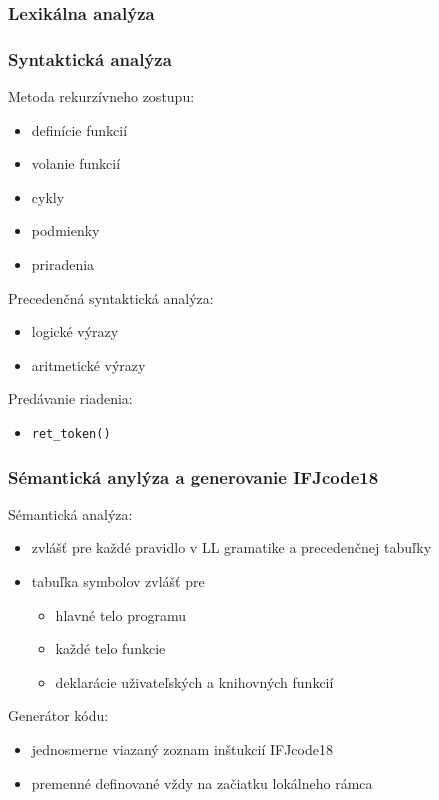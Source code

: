 \documentclass[usenames,dvipsnames]{beamer}
\begin{document}
\begin{frame}
	\frametitle{Lexikálna analýza}

\end{frame}
%	
\begin{frame}
	\frametitle{Syntaktická analýza}
	Metoda rekurzívneho zostupu:
	\begin{itemize}
		\item definície funkcií
	 	\item volanie funkcií
		\item cykly
		\item podmienky
		\item priradenia
	\end{itemize}
	Precedenčná syntaktická analýza:
	\begin{itemize}
		\item logické výrazy
		\item aritmetické výrazy
	\end{itemize}
	Predávanie riadenia:
	\begin{itemize}
		\item \texttt{ret\_token()}
	\end{itemize}
\end{frame}
%
\begin{frame}
	\frametitle{Sémantická anylýza a generovanie IFJcode18}
	Sémantická analýza:
	\begin{itemize}
		\item zvlášť pre každé pravidlo v LL gramatike a precedenčnej tabuľky
		\item tabuľka symbolov zvlášť pre
		\begin{itemize}
			\item hlavné telo programu
			\item každé telo funkcie
			\item deklarácie uživateľských a knihovných funkcií
		\end{itemize}
	\end{itemize}
	Generátor kódu:
	\begin{itemize}
		\item jednosmerne viazaný zoznam inštukcií IFJcode18
		\item premenné definované vždy na začiatku lokálneho rámca
	\end{itemize}
\end{frame}
\end{document}
